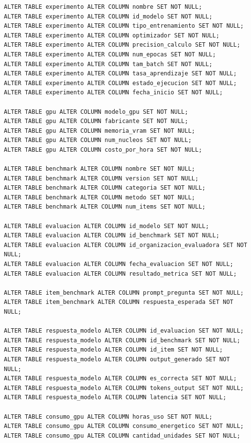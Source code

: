 \documentclass[12pt,a4paper]{article}
\begin{document}
\begin{lstlisting}
ALTER TABLE experimento ALTER COLUMN nombre SET NOT NULL;
ALTER TABLE experimento ALTER COLUMN id_modelo SET NOT NULL;
ALTER TABLE experimento ALTER COLUMN tipo_entrenamiento SET NOT NULL;
ALTER TABLE experimento ALTER COLUMN optimizador SET NOT NULL;
ALTER TABLE experimento ALTER COLUMN precision_calculo SET NOT NULL;
ALTER TABLE experimento ALTER COLUMN num_epocas SET NOT NULL;
ALTER TABLE experimento ALTER COLUMN tam_batch SET NOT NULL;
ALTER TABLE experimento ALTER COLUMN tasa_aprendizaje SET NOT NULL;
ALTER TABLE experimento ALTER COLUMN estado_ejecucion SET NOT NULL;
ALTER TABLE experimento ALTER COLUMN fecha_inicio SET NOT NULL;

ALTER TABLE gpu ALTER COLUMN modelo_gpu SET NOT NULL;
ALTER TABLE gpu ALTER COLUMN fabricante SET NOT NULL;
ALTER TABLE gpu ALTER COLUMN memoria_vram SET NOT NULL;
ALTER TABLE gpu ALTER COLUMN num_nucleos SET NOT NULL;
ALTER TABLE gpu ALTER COLUMN costo_por_hora SET NOT NULL;

ALTER TABLE benchmark ALTER COLUMN nombre SET NOT NULL;
ALTER TABLE benchmark ALTER COLUMN version SET NOT NULL;
ALTER TABLE benchmark ALTER COLUMN categoria SET NOT NULL;
ALTER TABLE benchmark ALTER COLUMN metodo SET NOT NULL;
ALTER TABLE benchmark ALTER COLUMN num_items SET NOT NULL;

ALTER TABLE evaluacion ALTER COLUMN id_modelo SET NOT NULL;
ALTER TABLE evaluacion ALTER COLUMN id_benchmark SET NOT NULL;
ALTER TABLE evaluacion ALTER COLUMN id_organizacion_evaluadora SET NOT NULL;
ALTER TABLE evaluacion ALTER COLUMN fecha_evaluacion SET NOT NULL;
ALTER TABLE evaluacion ALTER COLUMN resultado_metrica SET NOT NULL;

ALTER TABLE item_benchmark ALTER COLUMN prompt_pregunta SET NOT NULL;
ALTER TABLE item_benchmark ALTER COLUMN respuesta_esperada SET NOT NULL;

ALTER TABLE respuesta_modelo ALTER COLUMN id_evaluacion SET NOT NULL;
ALTER TABLE respuesta_modelo ALTER COLUMN id_benchmark SET NOT NULL;
ALTER TABLE respuesta_modelo ALTER COLUMN id_item SET NOT NULL;
ALTER TABLE respuesta_modelo ALTER COLUMN output_generado SET NOT NULL;
ALTER TABLE respuesta_modelo ALTER COLUMN es_correcta SET NOT NULL;
ALTER TABLE respuesta_modelo ALTER COLUMN tokens_output SET NOT NULL;
ALTER TABLE respuesta_modelo ALTER COLUMN latencia SET NOT NULL;

ALTER TABLE consumo_gpu ALTER COLUMN horas_uso SET NOT NULL;
ALTER TABLE consumo_gpu ALTER COLUMN consumo_energetico SET NOT NULL;
ALTER TABLE consumo_gpu ALTER COLUMN cantidad_unidades SET NOT NULL;



\end{lstlisting}
\end{document}
